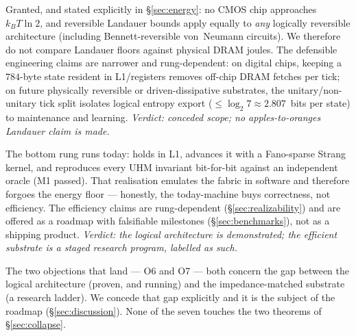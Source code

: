 \begin{redteambox}
Granted, and stated explicitly in \S\ref{sec:energy}: no CMOS chip approaches
$k_BT\ln 2$, and reversible Landauer bounds apply equally to \emph{any}
logically reversible architecture (including Bennett-reversible von~Neumann
circuits). We therefore do not compare Landauer floors against physical DRAM
joules. The defensible engineering claims are narrower and rung-dependent: on
digital chips, keeping a $784$-byte state resident in L1/registers removes
off-chip DRAM fetches per tick; on future physically reversible or
driven-dissipative substrates, the unitary/non-unitary tick split isolates
logical entropy export ($\le\log_2 7\approx 2.807$~bits per state) to
maintenance and learning.
\emph{Verdict: conceded scope; no apples-to-oranges Landauer claim is made.}
\end{redteambox}

\begin{redteambox}
The bottom rung runs today: \SYNARC{} holds \DM{} in L1, advances it with a
Fano-sparse Strang kernel, and reproduces every UHM invariant bit-for-bit
against an independent oracle (M1 passed). That realisation emulates the
fabric in software and therefore forgoes the energy floor --- honestly, the
today-machine buys correctness, not efficiency. The efficiency claims are
rung-dependent (\S\ref{sec:realizability}) and are offered as a roadmap with
falsifiable milestones (\S\ref{sec:benchmarks}), not as a shipping product.
\emph{Verdict: the logical architecture is demonstrated; the efficient
substrate is a staged research program, labelled as such.}
\end{redteambox}

\noindent The two objections that land --- O6 and O7 --- both concern the gap
between the logical architecture (proven, and running) and the
impedance-matched substrate (a research ladder). We concede that gap
explicitly and it is the subject of the roadmap (\S\ref{sec:discussion}).
None of the seven touches the two theorems of \S\ref{sec:collapse}.
